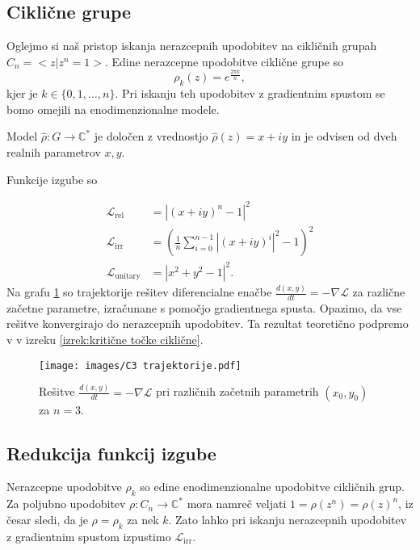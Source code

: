 \documentclass[mat2, tisk]{fmfdelo}
\newcommand{\loss }{\mathcal L}
\newcommand{\Loss}[1]{\mathcal L _\text{#1}}
\newcommand{\C}{\mathbb C}
\begin{document}
      \subsection{Ciklične grupe}
      \label{subsection : ciklicčne grupe}
      Oglejmo si naš pristop iskanja nerazcepnih upodobitev na
      cikličnih grupah $C_n = <z | z^n=1>$. Edine nerazcepne
      upodobitve ciklične grupe so
      $$
      \rho_k(z) = e^\frac{2 \pi k}{n},
      $$
      kjer je $k \in \{0, 1, \dotsc, n\}$. Pri iskanju teh upodobitev
      z gradientnim spustom se bomo omejili na enodimenzionalne modele.

      Model $\hat\rho \colon G \to \C^*$ je določen z vrednostjo
      $\hat\rho(z) = x + iy$ in je odvisen od dveh realnih parametrov $x, y$.

      Funkcije izgube so

      \begin{align}
        \label{eq:loss function Cn}
        \Loss{rel} &= |(x + iy)^n -1|^2\\
        \Loss{irr} &= (\frac{1}{n} \sum_{i=0}^{n-1} |(x + iy)^i|^2 -1)^2 \\
        \Loss{unitary} &= | x^2 + y^2 -1|^2.
      \end{align}
      Na grafu \ref{fig:ciklicna-trajektorije} so trajektorije
      rešitev diferencialne enačbe $\frac{d(x,y)}{dt} = -\nabla
      \loss$ za različne začetne parametre, izračunane s pomočjo
      gradientnega spusta. Opazimo, da vse rešitve konvergirajo do
      nerazcepnih upodobitev. Ta rezultat teoretično podpremo v v
      izreku \ref{izrek:kritične točke ciklične}.
      \begin{figure}[ht]
        \centering
        \texttt{[image: images/C3 trajektorije.pdf]}
        \caption{Rešitve $\frac{d(x,y)}{dt} = -\nabla \loss$ pri
        različnih začetnih parametrih $(x_0, y_0)$ za $n=3$.}
        \label{fig:ciklicna-trajektorije}
      \end{figure}
      \subsection{Redukcija funkcij izgube}
      Nerazcepne upodobitve $\rho_k$ so edine enodimenzionalne
      upodobitve cikličnih grup. Za poljubno upodobitev $\rho \colon
      C_n \to \C^*$ mora namreč veljati $1 = \rho(z^n) = \rho(z)^n$,
      iz česar sledi, da je $\rho = \rho_k$ za nek $k$.
      Zato lahko pri iskanju nerazcepnih upodobitev z gradientnim
      spustom izpustimo $\Loss{irr}$.
\end{document}
